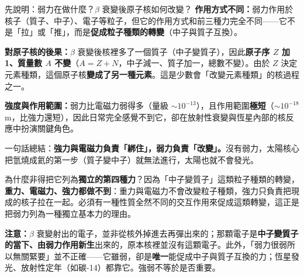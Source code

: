 \documentclass[11pt]{article}
\begin{document}
\begin{補充框}{先說明：弱力在做什麼？$\beta$ 衰變後原子核如何改變？}
\textbf{作用方式不同：}弱力作用於核子（質子、中子）、電子等粒子，但它的作用方式和前三種力完全不同——它不是「拉」或「推」，而是\textbf{促成粒子種類的轉變}（中子與質子互換）。

\textbf{對原子核的後果：}$\beta$ 衰變後核裡多了一個質子（中子變質子），因此\textbf{原子序 $Z$ 加 1、質量數 $A$ 不變}（$A=Z+N$，中子減一、質子加一，總數不變）。由於 $Z$ 決定元素種類，這個原子核\textbf{變成了另一種元素}。這是少數會「改變元素種類」的核過程之一。

\textbf{強度與作用範圍：}弱力比電磁力弱得多（量級 $\sim10^{-13}$），且作用範圍\textbf{極短}（$\sim10^{-18}$ m，比強力還短），因此日常完全感覺不到它，卻在放射性衰變與恆星內部的核反應中扮演關鍵角色。

一句話總結：\textbf{強力與電磁力負責「綁住」，弱力負責「改變」。}沒有弱力，太陽核心把氫燒成氦的第一步（質子變中子）就無法進行，太陽也就不會發光。
\end{補充框}

為什麼非得把它列為\textbf{獨立的第四種力}？因為「中子變質子」這類粒子種類的轉變，\textbf{重力、電磁力、強力都做不到}：重力與電磁力不會改變粒子種類，強力只負責把現成的核子拉在一起。必須有一種性質全然不同的交互作用來促成這類轉變，這正是把弱力列為一種獨立基本力的理由。

\textbf{注意：}$\beta$ 衰變射出的電子，並非從核外掉進去再彈出來的；那顆電子是\textbf{中子變質子的當下、由弱力作用新生}出來的，原本核裡並沒有這顆電子。此外，「弱力很弱所以無關緊要」並不正確——它雖弱，卻是\textbf{唯一}能促成中子與質子互換的力；恆星發光、放射性定年（如碳-14）都靠它。強弱不等於是否重要。
\end{document}
